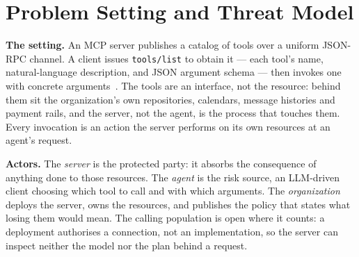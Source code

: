 %
%
%
%
%
\section{Problem Setting and Threat Model}
\label{sec:threat}

\textbf{The setting.} An MCP server publishes a catalog of tools over a uniform
JSON-RPC channel. A client issues \texttt{tools/list} to obtain it --- each
tool's name, natural-language description, and JSON argument schema --- then
invokes one with concrete
arguments~\cite{anthropic2024mcp,mcp2026spec}. The tools are an interface, not
the resource: behind them sit the organization's own repositories, calendars,
message histories and payment rails, and the server, not the agent, is the
process that touches them. Every invocation is an action the server performs on
its own resources at an agent's request.

\textbf{Actors.} The \emph{server} is the protected party: it absorbs the
consequence of anything done to those resources. The \emph{agent}
is the risk source, an LLM-driven client choosing which tool to call and with
which arguments. The \emph{organization} deploys the server, owns the
resources, and publishes the policy that states what losing them would mean. The
calling population is open where it counts: a deployment authorises a
connection, not an implementation, so the server can inspect neither the model
nor the plan behind a request.

